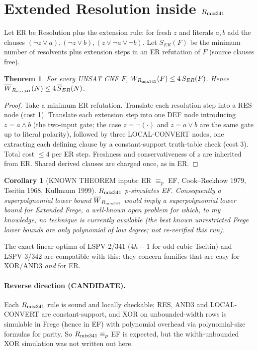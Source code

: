 \documentclass[11pt]{article}
\newtheorem{theorem}{Theorem}
\newtheorem{corollary}{Corollary}
\begin{document}
\section{Extended Resolution inside $R_{\rm mix341}$}
Let ER be Resolution plus the extension rule: for fresh $z$ and literals $a,b$ add the clauses $(\neg z\vee a),(\neg z\vee b),(z\vee\neg a\vee\neg b)$. Let $S_{ER}(F)$ be the minimum number of resolvents plus extension steps in an ER refutation of $F$ (source clauses free).
\begin{theorem}\label{sim}
For every UNSAT CNF $F$, $W_{R_{\rm mix341}}(F)\le 4\,S_{ER}(F)$. Hence $\overline W_{R_{\rm mix341}}(N)\le 4\,\overline S_{ER}(N)$.
\end{theorem}
\begin{proof}
Take a minimum ER refutation. Translate each resolution step into a RES node (cost 1). Translate each extension step into one DEF node introducing $z=a\wedge b$ (the two-input gate; the case $z=\neg(\cdot)$ and $z=a\vee b$ are the same gate up to literal polarity), followed by three LOCAL-CONVERT nodes, one extracting each defining clause by a constant-support truth-table check (cost 3). Total cost $\le 4$ per ER step. Freshness and conservativeness of $z$ are inherited from ER. Shared derived clauses are charged once, as in ER. \qedhere
\end{proof}
\begin{corollary}[KNOWN THEOREM inputs: ER $\equiv_p$ EF, Cook--Reckhow 1979, Tseitin 1968, Kullmann 1999]\label{ef}
$R_{\rm mix341}$ p-simulates EF. Consequently a superpolynomial lower bound $\overline W_{R_{\rm mix341}}$ would imply a superpolynomial lower bound for Extended Frege, a well-known open problem for which, to my knowledge, no technique is currently available (the best known unrestricted Frege lower bounds are only polynomial of low degree; not re-verified this run).
\end{corollary}
\noindent The exact linear optima of LSPV-2/341 ($4h-1$ for odd cubic Tseitin) and LSPV-3/342 are compatible with this: they concern families that are easy for XOR/AND3 \emph{and} for ER.

\paragraph{Reverse direction (CANDIDATE).} Each $R_{\rm mix341}$ rule is sound and locally checkable; RES, AND3 and LOCAL-CONVERT are constant-support, and XOR on unbounded-width rows is simulable in Frege (hence in EF) with polynomial overhead via polynomial-size formulas for parity. So $R_{\rm mix341}\equiv_p$ EF is expected, but the width-unbounded XOR simulation was not written out here.
\end{document}
